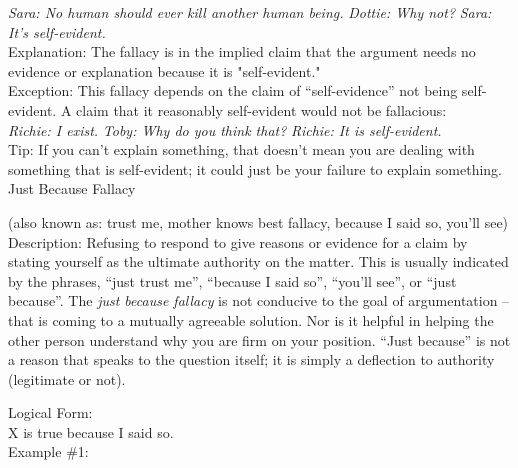 \documentclass[a4paper,12pt,single,pdftex]{scrartcl}
\begin{document}
    
      {\em Sara: No human should ever kill another human being.} \newline
{\em Dottie: Why not?} \newline
{\em Sara: It's self-evident.}
    \\

    
      Explanation: The fallacy is in the implied claim that the argument needs no evidence or explanation because it is "self-evident."
    \\

    
      Exception: This fallacy depends on the claim of “self-evidence” not being self-evident. A claim that it reasonably self-evident would not be fallacious:
    \\

    
      {\em Richie: I exist.} \newline
{\em Toby: Why do you think that?} \newline
{\em Richie: It is self-evident.}
    \\

    
      Tip: If you can't explain something, that doesn't mean you are dealing with something that is self-evident; it could just be your failure to explain something.
    \\

  

Just Because Fallacy
    
      (also known as: trust me, mother knows best fallacy, because I said so, you’ll see)
    \\

  
    Description: Refusing to respond to give reasons or evidence for a claim by stating yourself as the ultimate authority on the matter.  This is usually indicated by the phrases, “just trust me”, “because I said so”, “you’ll see”, or “just because”.  The {\it just because fallacy}  is not conducive to the goal of argumentation -- that is coming to a mutually agreeable solution.  Nor is it helpful in helping the other person understand why you are firm on your position. “Just because” is not a reason that speaks to the question itself; it is simply a deflection to authority (legitimate or not).

    
      Logical Form:
    \\

    
      X is true because I said so.
    \\

    
      Example \#1:
    \\
\end{document}
